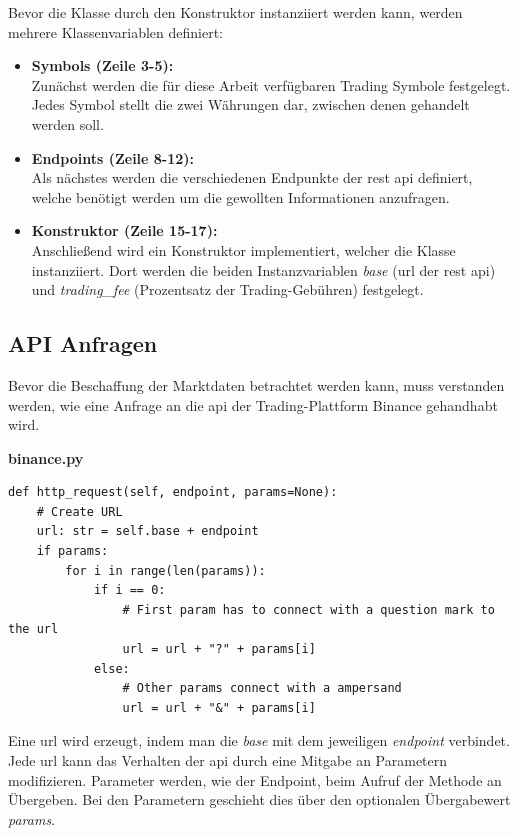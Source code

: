 \documentclass[oneside]{ausarbeitung}
\begin{document}
Bevor die Klasse durch den Konstruktor instanziiert werden kann, werden mehrere Klassenvariablen definiert: \\
\begin{itemize}
	\item \textbf{Symbols (Zeile 3-5):} \\
		Zunächst werden die für diese Arbeit verfügbaren Trading Symbole
		festgelegt. Jedes Symbol stellt die zwei Währungen dar, zwischen denen
		gehandelt werden soll.
	\item \textbf{Endpoints (Zeile 8-12):} \\
		Als nächstes werden die verschiedenen Endpunkte der \ac{rest} \ac{api}
		definiert, welche benötigt werden um die gewollten Informationen
		anzufragen.
	\item \textbf{Konstruktor (Zeile 15-17):} \\
		Anschließend wird ein Konstruktor implementiert, welcher die Klasse 
		instanziiert. Dort werden die beiden Instanzvariablen \textit{base} 
		(\ac{url} der \ac{rest} \ac{api}) und \textit{trading\_fee} (Prozentsatz 
		der Trading-Gebühren) festgelegt. 	

\end{itemize}
\subsection{API Anfragen}
\label{sub:api_anfragen}

Bevor die Beschaffung der Marktdaten betrachtet werden kann, muss verstanden werden, wie eine Anfrage an die \ac{api} der Trading-Plattform Binance gehandhabt wird.

\lstset{language=Python}
\lstset{frame=lines}
\lstset{basicstyle=\footnotesize}
\textbf{binance.py}
\begin{lstlisting}
def http_request(self, endpoint, params=None):
	# Create URL
	url: str = self.base + endpoint
	if params:
		for i in range(len(params)):
			if i == 0:
				# First param has to connect with a question mark to the url
				url = url + "?" + params[i]
			else:
				# Other params connect with a ampersand
				url = url + "&" + params[i]
\end{lstlisting}

Eine \ac{url} wird erzeugt, indem man die \textit{base} mit dem jeweiligen \textit{endpoint} verbindet. Jede \ac{url} kann das Verhalten der \ac{api} durch eine Mitgabe an Parametern modifizieren. Parameter werden, wie der Endpoint, beim Aufruf der Methode an Übergeben. Bei den Parametern geschieht dies über den optionalen Übergabewert \textit{params}. 
\end{document}
